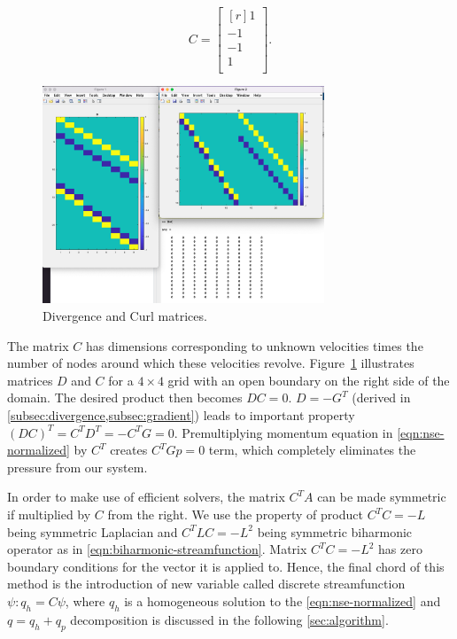 \documentclass{article}
\numberwithin{equation}{section}
\begin{document}
\begin{equation*}
  C = 
  \begin{bmatrix*}[r]
  1		\\
  -1	\\
  -1	\\
  1		\\
\end{bmatrix*}.
\end{equation*}

\begin{figure}[H]
\begin{center}
  \includegraphics[width=0.75\textwidth]{Figures/D-C-DC}
\end{center}
\caption{Divergence and Curl matrices.}
\label{fig:DC}
\end{figure}
The matrix $C$ has dimensions corresponding to unknown velocities times the number of nodes around which these velocities revolve. Figure~\ref{fig:DC} illustrates matrices $D$ and $C$ for a $4\times4$ grid with an open boundary on the right side of the domain. 
The desired product then becomes $DC=0$. $D=-G^T$ (derived in \cref{subsec:divergence,subsec:gradient}) leads to important property $(DC)^T=C^TD^T=-C^TG=0$. Premultiplying momentum equation in \cref{eqn:nse-normalized} by $C^T$ creates $C^TGp=0$ term, which completely eliminates the pressure from our system.

In order to make use of efficient solvers, the matrix $C^TA$ can be made symmetric if multiplied by $C$ from the right. We use the property of product $C^TC=-L$ being symmetric Laplacian and $C^TLC=-L^2$ being symmetric biharmonic operator as in \cref{eqn:biharmonic-streamfunction}. Matrix $C^TC=-L^2$ has zero boundary conditions for the vector it is applied to.
Hence, the final chord of this method is the introduction of new variable called discrete streamfunction $\psi:q_h=C\psi$, where $q_h$ is a homogeneous solution to the \cref{eqn:nse-normalized} and $q=q_h+q_p$ decomposition is discussed in the following \cref{sec:algorithm}.
\end{document}
